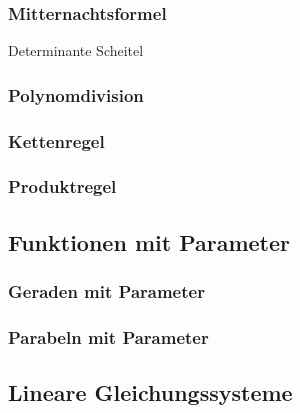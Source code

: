 \subsubsection{Mitternachtsformel}

Determinante
Scheitel

\subsubsection{Polynomdivision}

\subsubsection{Kettenregel}

\subsubsection{Produktregel}


\subsection{Funktionen mit Parameter}

\subsubsection{Geraden mit Parameter}

\subsubsection{Parabeln mit Parameter}

\subsection{Lineare Gleichungssysteme}